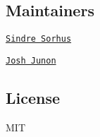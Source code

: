 \subsection*{Maintainers}


\begin{DoxyItemize}
\item \href{https://github.com/sindresorhus}{\tt Sindre Sorhus}
\item \href{https://github.com/qix-}{\tt Josh Junon}
\end{DoxyItemize}

\subsection*{License}

M\+IT 